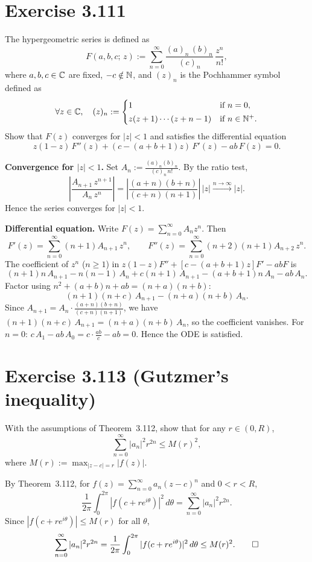 \documentclass{article}
\begin{document}
\section{Exercise 3.111}

The hypergeometric series is defined as
\[
  F(a,b,c;\,z) := \sum_{n=0}^{\infty}
  \frac{(a)_n\,(b)_n}{(c)_n}\,\frac{z^n}{n!},
\]
where $a, b, c \in \mathbb{C}$ are fixed, $-c \notin \mathbb{N}$,
and $(z)_n$ is the Pochhammer symbol defined as
\[
  \forall z \in \mathbb{C},\quad (z)_n :=
  \begin{cases} 1 & \text{if } n = 0, \\[2pt]
    z(z+1)\cdots(z+n-1) & \text{if } n \in \mathbb{N}^+.
  \end{cases}
\]
Show that $F(z)$ converges for $|z|<1$ and satisfies
the differential equation
\[
  z(1-z)\,F''(z) + (c-(a+b+1)z)\,F'(z) - ab\,F(z) = 0.
\]

\begin{solution}
  \textbf{Convergence for $|z| < 1$.}\;
  Set $A_n := \frac{(a)_n(b)_n}{(c)_n\,n!}$.
  By the ratio test,
  \[
    \left|\frac{A_{n+1}\,z^{n+1}}{A_n\,z^n}\right|
    = \left|\frac{(a+n)(b+n)}{(c+n)(n+1)}\right|\,|z|
    \xrightarrow{n\to\infty}|z|.
  \]
  Hence the series converges for $|z| < 1$.

  \textbf{Differential equation.}\;
  Write $F(z) = \sum_{n=0}^{\infty} A_n z^n$.
  Then
  \[
    F'(z) = \sum_{n=0}^{\infty} (n+1)A_{n+1}\,z^n,
    \qquad
    F''(z) = \sum_{n=0}^{\infty} (n+2)(n+1)A_{n+2}\,z^n.
  \]
  The coefficient of $z^n$ ($n \ge 1$) in
  $z(1-z)F'' + [c-(a+b+1)z]F' - abF$ is
  \[
    (n+1)n\,A_{n+1} - n(n-1)\,A_n
    + c(n+1)\,A_{n+1} - (a+b+1)n\,A_n - ab\,A_n.
  \]
  Factor using $n^2 + (a+b)n + ab = (n+a)(n+b)$:
  \[
    (n+1)(n+c)\,A_{n+1} - (n+a)(n+b)\,A_n.
  \]
  Since $A_{n+1} = A_n \cdot \frac{(a+n)(b+n)}{(c+n)(n+1)}$,
  we have $(n+1)(n+c)\,A_{n+1} = (n+a)(n+b)\,A_n$,
  so the coefficient vanishes.
  For $n = 0$: $c\,A_1 - ab\,A_0 = c \cdot \frac{ab}{c} - ab = 0$.
  Hence the ODE is satisfied.\qedhere
\end{solution}

\section{Exercise 3.113 (Gutzmer's inequality)}

With the assumptions of Theorem~3.112,
show that for any $r \in (0, R)$,
\[
  \sum_{n=0}^{\infty} |a_n|^2 r^{2n} \le M(r)^2,
\]
where $M(r) := \max_{|z-c|=r} |f(z)|$.

\begin{solution}
  By Theorem~3.112, for $f(z) = \sum_{n=0}^{\infty} a_n(z-c)^n$
  and $0 < r < R$,
  \[
    \frac{1}{2\pi}\int_0^{2\pi}|f(c+re^{i\theta})|^2\,d\theta
    = \sum_{n=0}^{\infty}|a_n|^2 r^{2n}.
  \]
  Since $|f(c+re^{i\theta})| \le M(r)$ for all $\theta$,
  \[
    \sum_{n=0}^{\infty}|a_n|^2 r^{2n}
    = \frac{1}{2\pi}\int_0^{2\pi}|f(c+re^{i\theta})|^2\,d\theta
    \le M(r)^2.\qedhere
  \]
\end{solution}
\end{document}
